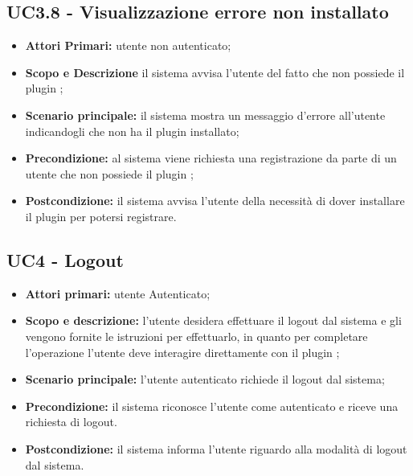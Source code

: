 \documentclass[AnalisiDeiRequisiti.tex]{subfiles}
\begin{document}
\subsection{UC3.8 - Visualizzazione errore  non installato}
\begin{itemize}
	\item \textbf{Attori Primari:} utente non autenticato;
	\item \textbf{Scopo e Descrizione} il sistema avvisa l'utente del fatto che non possiede il plugin ;
	\item \textbf{Scenario principale:} il sistema mostra un messaggio d'errore all'utente indicandogli che non ha il plugin  installato;
	\item \textbf{Precondizione:} al sistema viene richiesta una registrazione da parte di un utente che non possiede il plugin ;
	\item \textbf{Postcondizione:} il sistema avvisa l'utente della necessità di dover installare il plugin  per potersi registrare.
\end{itemize}
\subsection{UC4 - Logout}
\begin{itemize}
	\item \textbf{Attori primari:} utente Autenticato;
	\item \textbf{Scopo e descrizione:} l'utente desidera effettuare il logout dal sistema e gli vengono fornite le istruzioni per effettuarlo, in quanto per completare l'operazione l'utente deve interagire direttamente con il plugin ;
	\item \textbf{Scenario principale:} l'utente autenticato richiede il logout dal sistema;
	\item \textbf{Precondizione:} il sistema riconosce l'utente come autenticato e riceve una richiesta di logout.
	\item \textbf{Postcondizione:} il sistema informa l'utente riguardo alla modalità di logout dal sistema.
\end{itemize}
\end{document}
